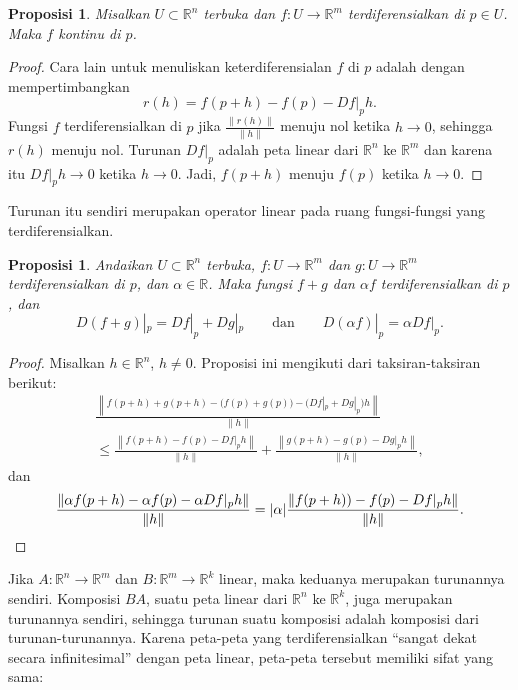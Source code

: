 \documentclass[12pt,openany]{book}
\newcommand{\sabs}[1]{\lvert {#1} \rvert}
\newcommand{\snorm}[1]{\lVert {#1} \rVert}
\newcommand{\norm}[1]{\left\lVert {#1} \right\rVert}
\newcommand{\R}{{\mathbb{R}}}
\newcommand{\myquote}[1]{``#1''}
\theoremstyle{plain}
\newtheorem{prop}[thm]{Proposisi}
\theoremstyle{remark}
\theoremstyle{definition}
\theoremstyle{exercise}
\theoremstyle{example}
\begin{document}
\begin{prop}
Misalkan $U \subset \R^n$ terbuka dan $f \colon U \to \R^m$
terdiferensialkan di $p \in U$.  Maka $f$ kontinu di $p$.
\end{prop}

\begin{proof}
Cara lain untuk menuliskan keterdiferensialan $f$ di $p$ adalah dengan mempertimbangkan
\begin{equation*}
r(h) = f(p+h)-f(p) - Df|_p h .
\end{equation*}
Fungsi $f$ terdiferensialkan di $p$ jika
$\frac{\snorm{r(h)}}{\snorm{h}}$ menuju nol ketika $h \to 0$,
sehingga
$r(h)$ menuju nol.  Turunan $D f|_p$
adalah peta linear dari $\R^n$ ke $\R^m$ dan karena itu
$D f|_p h \to 0$ ketika $h \to 0$.  Jadi,
$f(p+h)$ menuju $f(p)$ ketika $h \to 0$.
\end{proof}

Turunan itu sendiri merupakan operator linear pada ruang fungsi-fungsi
yang terdiferensialkan.

\begin{prop}
Andaikan $U \subset \R^n$ terbuka,
$f \colon U \to \R^m$ dan
$g \colon U \to \R^m$ terdiferensialkan di $p$,
dan $\alpha \in \R$.  Maka fungsi $f+g$ dan $\alpha f$
terdiferensialkan di $p$, dan
\begin{equation*}
D(f+g)|_p = Df|_p + Dg|_p \qquad \text{dan} \qquad D(\alpha f)|_p = \alpha
Df|_p .
\end{equation*}
\end{prop}

\begin{proof}
Misalkan $h \in \R^n$, $h \neq 0$.  Proposisi ini mengikuti dari taksiran-taksiran
berikut:
\begin{multline*}
\frac{\norm{f(p+h)+g(p+h)-\bigl(f(p)+g(p)\bigr) - \bigl(Df|_p + Dg|_p\bigr)h}}{\snorm{h}}
\\
\leq
\frac{\norm{f(p+h)-f(p) - Df|_ph}}{\snorm{h}}
+
\frac{\norm{g(p+h)-g(p) - Dg|_ph}}{\snorm{h}} ,
\end{multline*}
dan
\begin{equation*}
\frac{\norm{\alpha f(p+h) - \alpha f(p) - \alpha Df|_p h}}{\snorm{h}}
=
\sabs{\alpha} \frac{\norm{f(p+h))-f(p) - Df|_ph}}{\snorm{h}} .
\qedhere
\end{equation*}
\end{proof}

Jika $A \colon \R^n \to \R^m$ dan $B \colon \R^m \to \R^k$ linear, maka
keduanya merupakan turunannya sendiri.  Komposisi
$BA$, suatu peta linear dari $\R^n$ ke $\R^k$, juga merupakan turunannya sendiri, sehingga
turunan suatu komposisi adalah komposisi
dari turunan-turunannya.
Karena peta-peta yang terdiferensialkan \myquote{sangat dekat secara infinitesimal}
dengan peta linear, peta-peta tersebut memiliki sifat yang sama:
\end{document}
